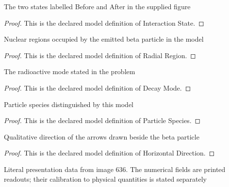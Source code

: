 \begin{definition}
  \label{def:physics:phyx-mini-0636:phyxminiproblems-problemphyxmini0636-interactionstate}
  The two states labelled Before and After in the supplied figure
\end{definition}
\begin{proof}
  This is the declared model definition of Interaction State.
\end{proof}
\begin{definition}
  \label{def:physics:phyx-mini-0636:phyxminiproblems-problemphyxmini0636-radialregion}
  Nuclear regions occupied by the emitted beta particle in the model
\end{definition}
\begin{proof}
  This is the declared model definition of Radial Region.
\end{proof}
\begin{definition}
  \label{def:physics:phyx-mini-0636:phyxminiproblems-problemphyxmini0636-decaymode}
  The radioactive mode stated in the problem
\end{definition}
\begin{proof}
  This is the declared model definition of Decay Mode.
\end{proof}
\begin{definition}
  \label{def:physics:phyx-mini-0636:phyxminiproblems-problemphyxmini0636-particlespecies}
  Particle species distinguished by this model
\end{definition}
\begin{proof}
  This is the declared model definition of Particle Species.
\end{proof}
\begin{definition}
  \label{def:physics:phyx-mini-0636:phyxminiproblems-problemphyxmini0636-horizontaldirection}
  Qualitative direction of the arrows drawn beside the beta particle
\end{definition}
\begin{proof}
  This is the declared model definition of Horizontal Direction.
\end{proof}
\begin{definition}
  \label{def:physics:phyx-mini-0636:phyxminiproblems-problemphyxmini0636-cesiumbetadecayfigure}
  Literal presentation data from image 636. The numerical fields are printed readouts; their calibration to physical quantities is stated separately
\end{definition}
